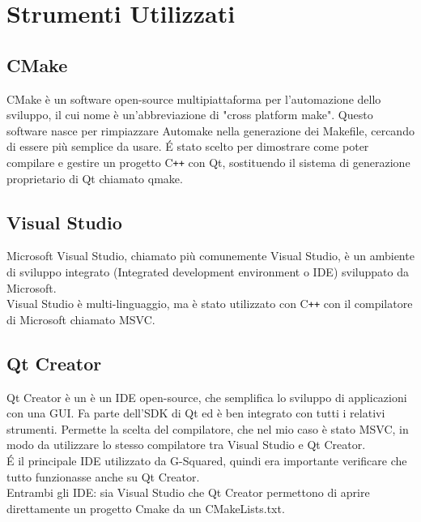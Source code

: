 \section{Strumenti Utilizzati}
\subsection{CMake}\label{sec:cmake}
CMake è un software open-source multipiattaforma per l'automazione dello sviluppo, il cui nome è un'abbreviazione di "cross platform make". Questo software nasce per rimpiazzare Automake nella generazione dei Makefile, cercando di essere più semplice da usare.
\'E stato scelto per dimostrare come poter compilare e gestire un progetto C\texttt{++} con Qt, sostituendo il sistema di generazione proprietario di Qt chiamato qmake.

\subsection{Visual Studio}\label{sec:visual-studio}
Microsoft Visual Studio, chiamato più comunemente Visual Studio, è un ambiente di sviluppo integrato (Integrated development environment o IDE) sviluppato da Microsoft.
\\
Visual Studio è multi-linguaggio, ma è stato utilizzato con C\texttt{++} con il compilatore di Microsoft chiamato MSVC.

\subsection{Qt Creator}\label{sec:qt-creator}
Qt Creator è un è un IDE open-source, che semplifica lo sviluppo di applicazioni con una GUI. Fa parte dell'SDK di Qt ed è ben integrato con tutti i relativi strumenti. Permette la scelta del compilatore, che nel mio caso è stato MSVC, in modo da utilizzare lo stesso compilatore tra Visual Studio e Qt Creator.
\\
\'E il principale IDE utilizzato da G-Squared, quindi era importante verificare che tutto funzionasse anche su Qt Creator.
\\
Entrambi gli IDE: sia Visual Studio che Qt Creator permettono di aprire direttamente un progetto Cmake da un CMakeLists.txt.

